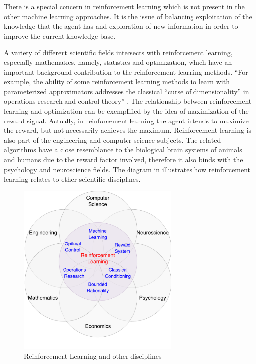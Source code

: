 There is a special concern in reinforcement learning which is not present in the other machine learning approaches. It is the issue of balancing exploitation of the knowledge that the agent has and exploration of new information in order to improve the current knowledge base.

A variety of different scientific fields intersects with reinforcement learning, especially mathematics, namely, statistics and optimization, which have an important background contribution to the reinforcement learning methods. “For example, the ability of some reinforcement learning methods to learn with parameterized approximators addresses the classical “curse of dimensionality” in operations research and control theory” \cite{Sutton}. The relationship between reinforcement learning and optimization can be exemplified by the idea of maximization of the reward signal. Actually, in reinforcement learning the agent intends to maximize the reward, but not necessarily achieves the maximum. Reinforcement learning is also part of the engineering and computer science subjects. The related algorithms have a close resemblance to the biological brain systems of animals and humans due to the reward factor involved, therefore it also binds with the psychology and neuroscience fields. The diagram in  illustrates how reinforcement learning relates to other scientific disciplines.
\begin{figure}[H]
	\centering
	\includegraphics[width=0.7\textwidth]{Figures/RLandOther}
	\caption{Reinforcement Learning and other disciplines}
	\label{fig:RLandOther}
\end{figure}
